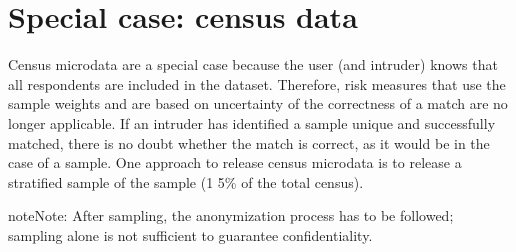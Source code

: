 \documentclass[letterpaper,10pt,english]{sphinxmanual}
\begin{document}
\section{Special case: census data}
\label{\detokenize{anon_methods:special-case-census-data}}
Census microdata are a special case because the user (and intruder)
knows that all respondents are included in the dataset. Therefore, risk
measures that use the sample weights and are based on uncertainty of the
correctness of a match are no longer applicable. If an intruder has
identified a sample unique and successfully matched, there is no doubt
whether the match is correct, as it would be in the case of a sample.
One approach to release census microdata is to release a stratified
sample of the sample (1 \textendash{} 5\% of the total census).

\begin{sphinxadmonition}{note}{Note:}
After sampling, the anonymization process has to be followed; sampling alone
is not sufficient to guarantee confidentiality.
\end{sphinxadmonition}
\end{document}
